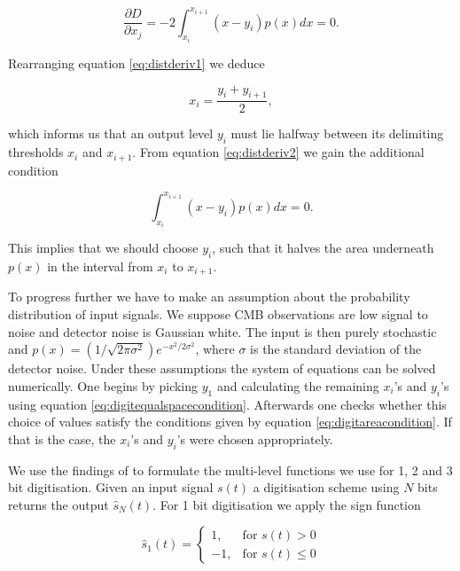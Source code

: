 \documentclass[apj]{emulateapj}
\begin{document}
\begin{equation} \label{eq:distderiv2}
\frac{\partial D}{\partial x_j} = -2 \int_{x_i}^{x_{i+1}} \left( x-y_i \right) p(x) dx = 0.
\end{equation}

Rearranging equation \ref{eq:distderiv1} we deduce

\begin{equation} \label{eq:digitequalspacecondition}
x_i = \frac{y_i+y_{i+1}}{2},
\end{equation}

which informs us that an output level $y_i$ must lie halfway between its delimiting thresholds $x_i$ and $x_{i+1}$. From equation \ref{eq:distderiv2} we gain the additional condition

\begin{equation} \label{eq:digitareacondition}
\int_{x_i}^{x_{i+1}} \left( x-y_i \right) p(x) dx = 0.
\end{equation}

This implies that we should choose $y_i$, such that it halves the area underneath $p(x)$ in the interval from $x_i$ to $x_{i+1}$.

To progress further we have to make an assumption about the probability distribution of input signals. We suppose CMB observations are low signal to noise and detector noise is Gaussian white. The input is then purely stochastic and  $p(x) = (1/\sqrt{2\pi\sigma^2}) e^{-x^2/2\sigma^2}$, where $\sigma$ is the standard deviation of the detector noise. Under these assumptions the system of equations can be solved numerically. One begins by picking $y_1$ and calculating the remaining $x_i$'s and $y_i$'s using equation \ref{eq:digitequalspacecondition}. Afterwards one checks whether this choice of values satisfy the conditions given by equation \ref{eq:digitareacondition}. If that is the case, the $x_i$'s and $y_i$'s were chosen appropriately.

We use the findings of \cite{max1960} to formulate the multi-level functions we use for 1, 2 and 3 bit digitisation. Given an input signal $s(t)$ a digitisation scheme using $N$ bits returns the output $\hat{s}_N(t)$. For 1 bit digitisation we apply the sign function

\begin{equation} \label{eq:1bit}
\hat{s}_1(t) = \left\{ \begin{array}{lr}
1, & \text{for } s(t) > 0\\
-1, & \text{for } s(t) \leq 0
\end{array} \right. \end{equation}
\end{document}

